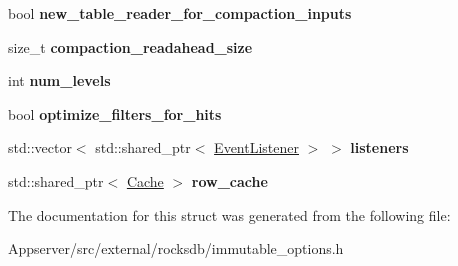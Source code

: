 \begin{DoxyCompactItemize}
\item 
bool {\bfseries new\+\_\+table\+\_\+reader\+\_\+for\+\_\+compaction\+\_\+inputs}\hypertarget{structrocksdb_1_1ImmutableCFOptions_a124a7dc458e4eb9fd2e5260047c3fb9b}{}\label{structrocksdb_1_1ImmutableCFOptions_a124a7dc458e4eb9fd2e5260047c3fb9b}

\item 
size\+\_\+t {\bfseries compaction\+\_\+readahead\+\_\+size}\hypertarget{structrocksdb_1_1ImmutableCFOptions_af01c151ec7eea87362582779e5085fa5}{}\label{structrocksdb_1_1ImmutableCFOptions_af01c151ec7eea87362582779e5085fa5}

\item 
int {\bfseries num\+\_\+levels}\hypertarget{structrocksdb_1_1ImmutableCFOptions_a346d22bb964705b153c302c32be79699}{}\label{structrocksdb_1_1ImmutableCFOptions_a346d22bb964705b153c302c32be79699}

\item 
bool {\bfseries optimize\+\_\+filters\+\_\+for\+\_\+hits}\hypertarget{structrocksdb_1_1ImmutableCFOptions_a49d382a31d0177b5b83d56aaffab2305}{}\label{structrocksdb_1_1ImmutableCFOptions_a49d382a31d0177b5b83d56aaffab2305}

\item 
std\+::vector$<$ std\+::shared\+\_\+ptr$<$ \hyperlink{classrocksdb_1_1EventListener}{Event\+Listener} $>$ $>$ {\bfseries listeners}\hypertarget{structrocksdb_1_1ImmutableCFOptions_a0bac7d248e419650e034d4f2b992440f}{}\label{structrocksdb_1_1ImmutableCFOptions_a0bac7d248e419650e034d4f2b992440f}

\item 
std\+::shared\+\_\+ptr$<$ \hyperlink{classrocksdb_1_1Cache}{Cache} $>$ {\bfseries row\+\_\+cache}\hypertarget{structrocksdb_1_1ImmutableCFOptions_a0af1f42a94c3fe1b25cee22ef5252893}{}\label{structrocksdb_1_1ImmutableCFOptions_a0af1f42a94c3fe1b25cee22ef5252893}

\end{DoxyCompactItemize}


The documentation for this struct was generated from the following file\+:\begin{DoxyCompactItemize}
\item 
Appserver/src/external/rocksdb/immutable\+\_\+options.\+h\end{DoxyCompactItemize}
